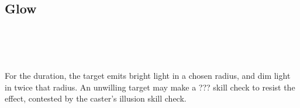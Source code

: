 \subsection*{Glow}
 \\
 \\
 \\

For the duration, the target emits bright light in a chosen radius, and dim
light in twice that radius. An unwilling target may make a ??? skill check to
resist the effect, contested by the caster's illusion skill check.
